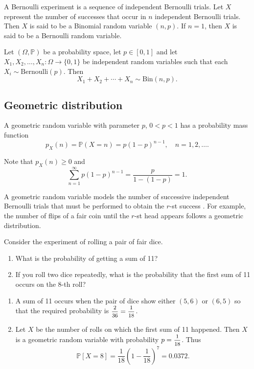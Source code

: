 A Bernoulli experiment is a sequence of independent Bernoulli trials. Let $X$ represent the number of successes 
that occur in $n$ independent Bernoulli trials. Then $X$ is said to be a Binomial random variable $(n,p)$. 
If $n = 1$, then $X$ is said to be a Bernoulli random variable.

\begin{theorem}
    Let $(\Omega, \mathbb{P})$ be a probability space, let $p \in [0,1]$ and let $X_1, X_2, \ldots, X_n : \Omega \to \{0, 1\}$ be 
    independent random variables such that each $X_i \sim \text{Bernoulli}(p)$. Then 
    \[
        X_1 + X_2 + \cdots + X_n \sim \text{Bin}(n,p).
    \]
\end{theorem}

\subsection{Geometric distribution}

A geometric random variable with parameter $p$, $0 < p < 1$ has a probability mass function
\begin{equation}
    p_X(n) = \mathbb{P}(X = n) = p(1-p)^{n-1}, \quad n=1,2,\ldots.
\end{equation}

Note that $p_X(n) \geq 0$ and 
\begin{equation}
    \sum^\infty_{n=1} p(1-p)^{n-1} = \frac{p}{1-(1-p)} = 1.
\end{equation}

A geometric random variable models the number of successive independent
 Bernoulli trials that must be performed to obtain the $r$-st success . For
 example, the number of flips of a fair coin until the $r$-st head appears follows
 a geometric distribution.

\begin{example}
    Consider the experiment of rolling a pair of fair dice.
    \begin{enumerate}
        \item What is the probability of getting a sum of 11?
        \item If you roll two dice repeatedly, what is the probability that the first sum of 11 
            occurs on the 8-th roll?
    \end{enumerate}
\end{example}
\begin{solution}
    \begin{enumerate}
        \item A sum of 11 occurs when the pair of dice show either $(5,6)$ or $(6, 5)$ so that the 
            required probability is $\mfrac{2}{36} = \mfrac{1}{18}$.
        \item Let $X$ be the number of rolls on which the first sum of 11 happened. Then 
            $X$ is a geometric random variable with probability $p = \mfrac{1}{18}$. Thus
            \[
                \mathbb{P}[X = 8] = \frac{1}{18} \left( 1 - \frac{1}{18} \right)^7 = 0.0372.
            \]
    \end{enumerate}
\end{solution}

